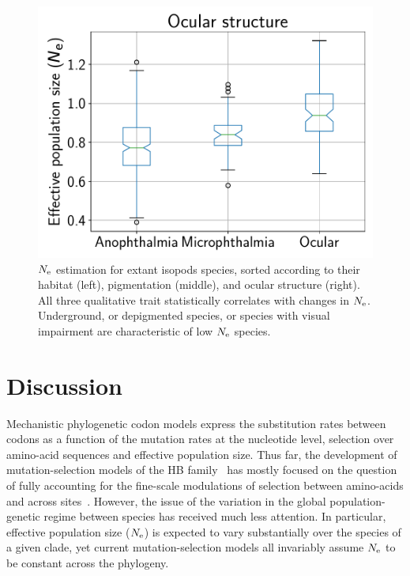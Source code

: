 \documentclass{article}
\begin{document}
\begin{figure}[t]
    \begin{minipage}{0.32\linewidth}
        \includegraphics[width=\linewidth, page=1]{isopods/12CDS_SiteMutSelBranchNe_Rep_LogPopulationSize_eye_merged}
    \end{minipage}
	\hfill
    \caption[$\Ne$ as a function of traits in isopods]{
        $\Ne$ estimation for extant isopods species, sorted according to their habitat (left), pigmentation (middle), and ocular structure (right).
        All three qualitative trait statistically correlates with changes in $\Ne$.
        Underground, or depigmented species, or species with visual impairment are characteristic of low $\Ne$ species.}
    \label{fig:isopods_correlation}
\end{figure}


\section{Discussion}
\label{sec:Discussion}
Mechanistic phylogenetic {codon} models express the {substitution} rates between codons as a function of the mutation rates at the nucleotide level, selection over amino-acid sequences and {effective population size}.
Thus far, the development of mutation-selection models of the {HB} family~\citep{Rodrigue2010, Tamuri2012} has mostly focused on the question of fully accounting for the fine-scale modulations of selection between amino-acids and across sites~\citep{Rodrigue2010, Tamuri2012}.
However, the issue of the variation in the global population-genetic regime between species has received much less attention.
In particular, {effective population size} ($\Ne$) is expected to vary substantially over the species of a given clade, yet current mutation-selection models all invariably assume $\Ne$ to be constant across the phylogeny.
\end{document}
